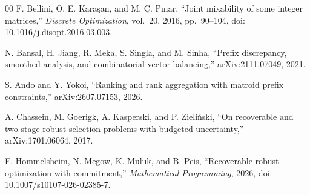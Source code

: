 \documentclass[conference]{IEEEtran}
\theoremstyle{definition}
\begin{document}
\begin{thebibliography}{00}
 F. Bellini, O. E. Kara\c{s}an, and M. \c{C}. P\i nar,
``Joint mixability of some integer matrices,'' \emph{Discrete Optimization}, vol.~20,
2016, pp.~90--104, doi: 10.1016/j.disopt.2016.03.003.

 N. Bansal, H. Jiang, R. Meka, S. Singla, and M. Sinha,
``Prefix discrepancy, smoothed analysis, and combinatorial vector balancing,''
arXiv:2111.07049, 2021.

 S. Ando and Y. Yokoi, ``Ranking and rank aggregation with matroid
prefix constraints,'' arXiv:2607.07153, 2026.

 A. Chassein, M. Goerigk, A. Kasperski, and P. Zieli\'nski,
``On recoverable and two-stage robust selection problems with budgeted uncertainty,''
arXiv:1701.06064, 2017.

 F. Hommelsheim, N. Megow, K. Muluk, and B. Peis,
``Recoverable robust optimization with commitment,'' \emph{Mathematical Programming},
2026, doi: 10.1007/s10107-026-02385-7.

\end{thebibliography}
\end{document}
